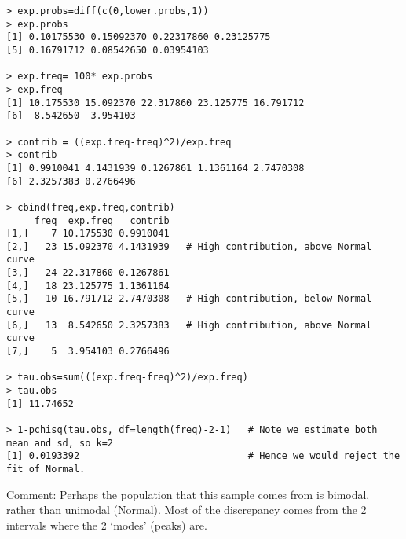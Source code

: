 \documentclass[bigtut]{tutorial}\usepackage[]{graphicx}\usepackage[]{color}
\begin{document}
\begin{tutorial}
\begin{questions}
\begin{solution}
\begin{verbatim}
> exp.probs=diff(c(0,lower.probs,1))
> exp.probs
[1] 0.10175530 0.15092370 0.22317860 0.23125775
[5] 0.16791712 0.08542650 0.03954103

> exp.freq= 100* exp.probs
> exp.freq
[1] 10.175530 15.092370 22.317860 23.125775 16.791712
[6]  8.542650  3.954103

> contrib = ((exp.freq-freq)^2)/exp.freq
> contrib
[1] 0.9910041 4.1431939 0.1267861 1.1361164 2.7470308
[6] 2.3257383 0.2766496

> cbind(freq,exp.freq,contrib)
     freq  exp.freq   contrib
[1,]    7 10.175530 0.9910041
[2,]   23 15.092370 4.1431939   # High contribution, above Normal curve
[3,]   24 22.317860 0.1267861
[4,]   18 23.125775 1.1361164
[5,]   10 16.791712 2.7470308   # High contribution, below Normal curve
[6,]   13  8.542650 2.3257383   # High contribution, above Normal curve
[7,]    5  3.954103 0.2766496

> tau.obs=sum(((exp.freq-freq)^2)/exp.freq)
> tau.obs
[1] 11.74652

> 1-pchisq(tau.obs, df=length(freq)-2-1)   # Note we estimate both mean and sd, so k=2
[1] 0.0193392                              # Hence we would reject the fit of Normal.
\end{verbatim}

Comment: Perhaps the population that this sample comes from is bimodal, rather than unimodal (Normal). Most of the discrepancy comes from the 2 intervals where the 2 `modes' (peaks) are.

\end{solution}



\end{questions}

\end{tutorial}
\end{document}
